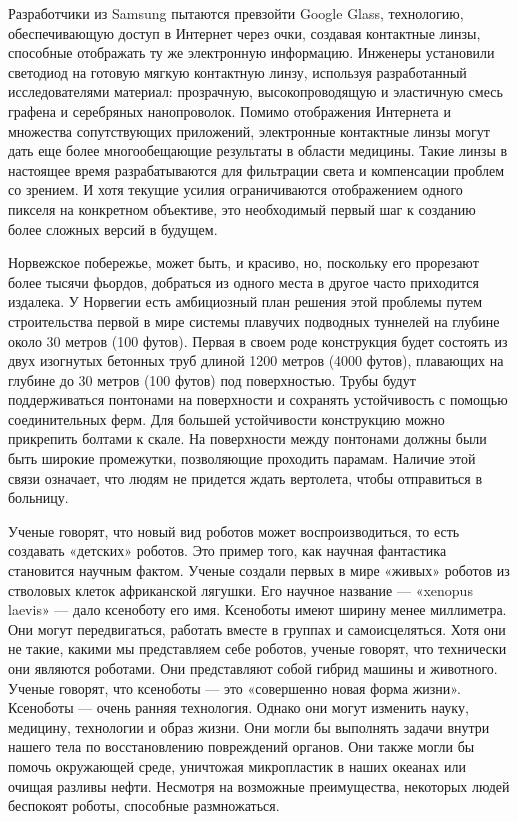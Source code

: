  Разработчики из Samsung пытаются превзойти Google Glass, технологию, обеспечивающую доступ в Интернет через очки, создавая контактные линзы, способные отображать ту же электронную информацию. Инженеры установили светодиод на готовую мягкую контактную линзу, используя разработанный исследователями материал: прозрачную, высокопроводящую и эластичную смесь графена и серебряных нанопроволок. Помимо отображения Интернета и множества сопутствующих приложений, электронные контактные линзы могут дать еще более многообещающие результаты в области медицины. Такие линзы в настоящее время разрабатываются для фильтрации света и компенсации проблем со зрением. И хотя текущие усилия ограничиваются отображением одного пикселя на конкретном объективе, это необходимый первый шаг к созданию более сложных версий в будущем.

 Норвежское побережье, может быть, и красиво, но, поскольку его прорезают более тысячи фьордов, добраться из одного места в другое часто приходится издалека. У Норвегии есть амбициозный план решения этой проблемы путем строительства первой в мире системы плавучих подводных туннелей на глубине около 30 метров (100 футов). Первая в своем роде конструкция будет состоять из двух изогнутых бетонных труб длиной 1200 метров (4000 футов), плавающих на глубине до 30 метров (100 футов) под поверхностью. Трубы будут поддерживаться понтонами на поверхности и сохранять устойчивость с помощью соединительных ферм. Для большей устойчивости конструкцию можно прикрепить болтами к скале. На поверхности между понтонами должны были быть широкие промежутки, позволяющие проходить парамам. Наличие этой связи означает, что людям не придется ждать вертолета, чтобы отправиться в больницу.

 Ученые говорят, что новый вид роботов может воспроизводиться, то есть создавать «детских» роботов. Это пример того, как научная фантастика становится научным фактом. Ученые создали первых в мире «живых» роботов из стволовых клеток африканской лягушки. Его научное название — «xenopus laevis» — дало ксеноботу его имя. Ксеноботы имеют ширину менее миллиметра. Они могут передвигаться, работать вместе в группах и самоисцеляться. Хотя они не такие, какими мы представляем себе роботов, ученые говорят, что технически они являются роботами. Они представляют собой гибрид машины и животного. Ученые говорят, что ксеноботы — это «совершенно новая форма жизни». Ксеноботы — очень ранняя технология. Однако они могут изменить науку, медицину, технологии и образ жизни. Они могли бы выполнять задачи внутри нашего тела по восстановлению повреждений органов. Они также могли бы помочь окружающей среде, уничтожая микропластик в наших океанах или очищая разливы нефти. Несмотря на возможные преимущества, некоторых людей беспокоят роботы, способные размножаться.

